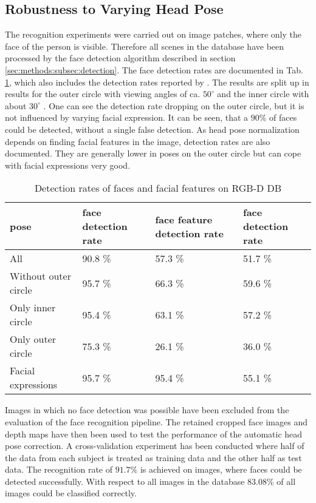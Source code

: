 \subsection{Robustness to Varying Head Pose}
\label{sec:evaluation:subsec:headpose}
The recognition experiments were carried out on image patches, where only the face of the person is visible.
Therefore all scenes in the database have been processed by the face detection algorithm described in section \ref{sec:methods:subsec:detection}. %
The face detection rates are documented in Tab. \ref{tab:EvalHeadPoseFaceDetection}, which also includes the detection rates reported by \cite{Jasek2012}.
The results are split up in results for the outer circle with viewing angles of ca. $50^\circ$ and the inner circle with about $30^\circ$ \cite{Jasek2012}.
One can see the detection rate dropping on the outer circle, but it is not influenced by varying facial expression.
It can be seen, that a $90\%$ of faces could be detected, without a single false detection.
As head pose normalization depends on finding facial features in the image, detection rates are also documented.
They are generally lower in poses on the outer circle but can cope with facial expressions very good.
\begin{table}[htbp]
  \centering
  \caption{Detection rates of faces and facial features on RGB-D DB}
  \label{tab:EvalHeadPoseFaceDetection}
  \begin{tabular}{p{2.0cm}|p{1.3cm}|p{1.3cm}|p{1.3cm}}
    pose & face detection rate& face feature detection rate & face detection rate \cite{Jasek2012}\\
    \hline
    All                  &  90.8 \%& 57.3 \%&51.7 \%\\
    Without outer circle &  95.7 \%& 66.3 \%&59.6 \%\\ 
    Only inner circle    &  95.4 \%& 63.1 \%&57.2 \%\\
    Only outer circle   &   75.3 \%& 26.1 \%&36.0 \%\\
    Facial expressions   &  95.7 \%& 95.4 \%&55.1 \%\\
    \end{tabular}
\end{table}

Images in which no face detection was possible have been excluded from the evaluation of the face recognition pipeline.
The retained cropped face images and depth maps have then been used to test the performance of the automatic head pose correction.
A cross-validation experiment has been conducted where half of the data from each subject is treated as training data and the other half as test data.
The recognition rate of $91.7\%$ is achieved on images, where faces could be detected successfully.
With respect to all images in the database $83.08\%$ of all images could be classified correctly.

